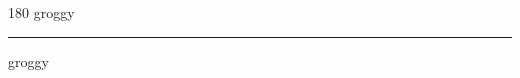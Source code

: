 
\begin{frame}
\begin{center}
\begin{turn}{180}
{\fontsize{2.5cm}{1em}\selectfont groggy}
\end{turn}
\vspace{1em}\par  
\hrule
\vspace{1em}\par  
{\fontsize{2.5cm}{1em}\selectfont groggy}
\end{center}
\end{frame}
